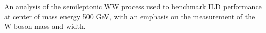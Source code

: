 %

%
An analysis of the semileptonic WW process used to benchmark ILD performance at center of mass energy 500 GeV, with an emphasis on the measurement of the W-boson mass and width.